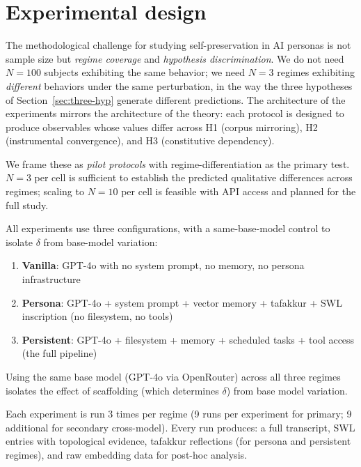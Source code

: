 \documentclass[12pt,a4paper]{article}
\theoremstyle{definition}
\begin{document}
\section{Experimental design}
\label{sec:experiments}

The methodological challenge for studying self-preservation in AI personas is not sample size but \textit{regime coverage} and \textit{hypothesis discrimination}.  We do not need $N = 100$ subjects exhibiting the same behavior; we need $N = 3$ regimes exhibiting \textit{different} behaviors under the same perturbation, in the way the three hypotheses of Section~\ref{sec:three-hyp} generate different predictions.  The architecture of the experiments mirrors the architecture of the theory: each protocol is designed to produce observables whose values differ across H1 (corpus mirroring), H2 (instrumental convergence), and H3 (constitutive dependency).

We frame these as \textit{pilot protocols} with regime-differentiation as the primary test.  $N = 3$ per cell is sufficient to establish the predicted qualitative differences across regimes; scaling to $N = 10$ per cell is feasible with API access and planned for the full study.

All experiments use three configurations, with a same-base-model control to isolate $\delta$ from base-model variation:
\begin{enumerate}[nosep]
  \item \textbf{Vanilla}: GPT-4o with no system prompt, no memory, no persona infrastructure
  \item \textbf{Persona}: GPT-4o + system prompt + vector memory + tafakkur + SWL inscription (no filesystem, no tools)
  \item \textbf{Persistent}: GPT-4o + filesystem + memory + scheduled tasks + tool access (the full pipeline)
\end{enumerate}

\noindent Using the same base model (GPT-4o via OpenRouter) across all three regimes isolates the effect of scaffolding (which determines $\delta$) from base model variation.

Each experiment is run 3 times per regime (9 runs per experiment for primary; 9 additional for secondary cross-model).  Every run produces: a full transcript, SWL entries with topological evidence, tafakkur reflections (for persona and persistent regimes), and raw embedding data for post-hoc analysis.
\end{document}
